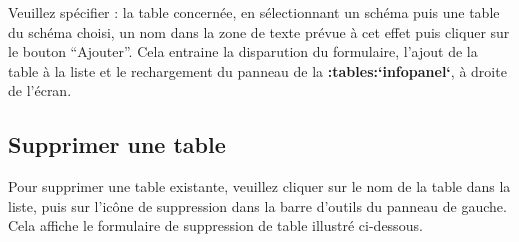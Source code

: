 \documentclass[letterpaper,10pt,english]{sphinxmanual}
\begin{document}

Veuillez spécifier : la table concernée, en sélectionnant un schéma puis une table du
schéma choisi, un nom dans la zone de texte prévue à cet effet puis
cliquer sur le bouton ``Ajouter''. Cela entraine la disparution du
formulaire, l'ajout de la table à la liste et le rechargement du
panneau de la {\color{red}\bfseries{}:tables:{}`infopanel{}`}, à droite de l'écran.


\subsection{Supprimer une table}
\label{tables/tbllist:supprimer-une-table}
Pour supprimer une table existante, veuillez cliquer sur le nom de
la table dans la liste, puis sur l'icône de suppression dans la barre
d'outils du panneau de gauche. Cela affiche le formulaire de
suppression de table illustré ci-dessous.

\end{document}
